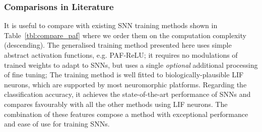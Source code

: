 	\subsubsection{Comparisons in Literature}
	It is useful to compare with existing SNN training methods shown in Table~\ref{tbl:compare_paf} where we order them on the computation complexity (descending).
	The generalised training method presented here uses simple abstract activation functions, e.g. PAF-ReLU;
	it requires no modulations of trained weights to adapt to SNNs, but uses a single \emph{optional} additional processing of fine tuning;
	The training method is well fitted to biologically-plausible LIF neurons, which are supported by most neuromorphic platforms.
	Regarding the classification accuracy, it achieves the state-of-the-art performance of SNNs and compares favourably with all the other methods using LIF neurons.
	The combination of these features compose a method with exceptional performance and ease of use for training SNNs.

